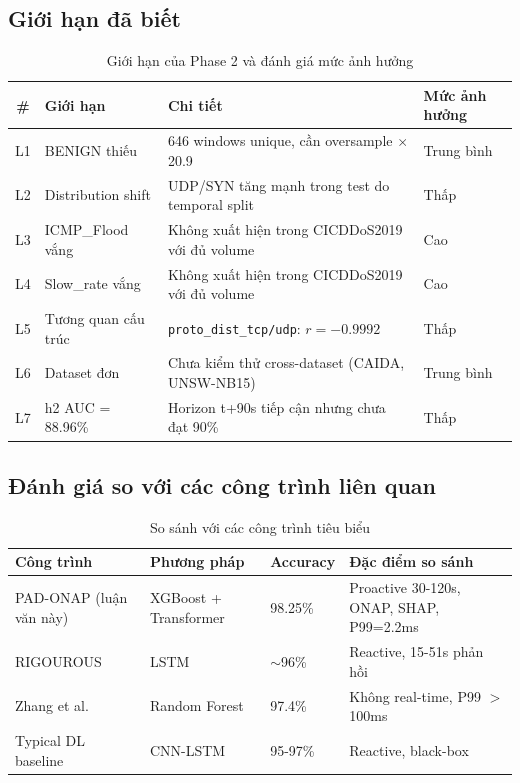 \documentclass[12pt,a4paper]{article}
\begin{document}
\subsection{Giới hạn đã biết}

\begin{table}[H]
\centering
\caption{Giới hạn của Phase 2 và đánh giá mức ảnh hưởng}
\label{tab:limitations}
\begin{tabular}{clp{7cm}l}
\toprule
\textbf{\#} & \textbf{Giới hạn} & \textbf{Chi tiết} & \textbf{Mức ảnh hưởng} \\
\midrule
L1 & BENIGN thiếu    & 646 windows unique, cần oversample $\times$20.9 & Trung bình \\
L2 & Distribution shift & UDP/SYN tăng mạnh trong test do temporal split & Thấp \\
L3 & ICMP\_Flood vắng & Không xuất hiện trong CICDDoS2019 với đủ volume & Cao \\
L4 & Slow\_rate vắng  & Không xuất hiện trong CICDDoS2019 với đủ volume & Cao \\
L5 & Tương quan cấu trúc & \texttt{proto\_dist\_tcp/udp}: $r = -0.9992$ & Thấp \\
L6 & Dataset đơn     & Chưa kiểm thử cross-dataset (CAIDA, UNSW-NB15) & Trung bình \\
L7 & h2 AUC = 88.96\% & Horizon t+90s tiếp cận nhưng chưa đạt 90\% & Thấp \\
\bottomrule
\end{tabular}
\end{table}

\subsection{Đánh giá so với các công trình liên quan}

\begin{table}[H]
\centering
\caption{So sánh với các công trình tiêu biểu}
\label{tab:related_work}
\begin{tabular}{p{3.5cm}p{2.5cm}p{2.5cm}p{5cm}}
\toprule
\textbf{Công trình} & \textbf{Phương pháp} & \textbf{Accuracy} & \textbf{Đặc điểm so sánh} \\
\midrule
PAD-ONAP (luận văn này) & XGBoost + Transformer & 98.25\% & Proactive 30-120s, ONAP, SHAP, P99=2.2ms \\
RIGOUROUS \cite{rigourous2026} & LSTM & $\sim$96\% & Reactive, 15-51s phản hồi \\
Zhang et al. \cite{zhang2023} & Random Forest & 97.4\% & Không real-time, P99 $>$ 100ms \\
Typical DL baseline & CNN-LSTM & 95-97\% & Reactive, black-box \\
\bottomrule
\end{tabular}
\end{table}
\end{document}
